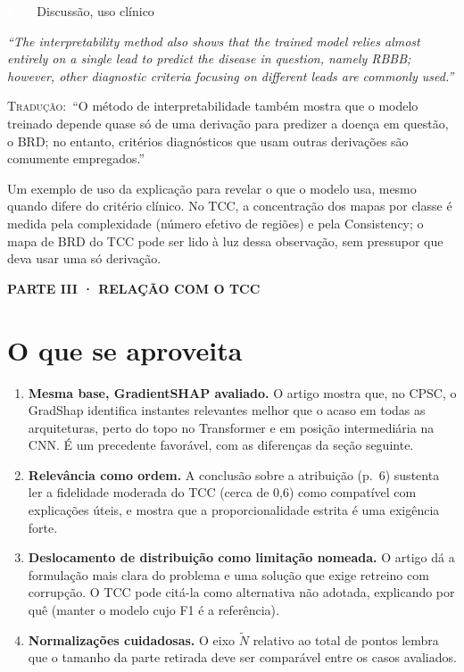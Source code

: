 \documentclass[11pt,a4paper]{article}
\newcommand{\pagechip}[1]{{\setlength{\fboxsep}{1.5pt}\colorbox{cAcc}{\textcolor{white}{\scriptsize\texttt{#1}}}}}
\newcommand{\partbar}[1]{\par\vspace{1.2em}\noindent\colorbox{black!80}{\parbox{\dimexpr\linewidth-2\fboxsep}{\color{white}\bfseries\sffamily\MakeUppercase{#1}}}\par\vspace{0.4em}}
\newenvironment{origquote}{\par\itshape\small}{\par}
\newenvironment{tradquote}{\par\small\textsc{Tradução:}\ }{\par}
\newcommand{\explab}[1]{\par\smallskip{\small\color{cAcc}\textbf{\MakeUppercase{#1}}}\par}
\begin{document}
\begin{citacard}{\pagechip{p. 7} Discussão, uso clínico}
\begin{origquote}“The interpretability method also shows that the trained model relies almost entirely on a single lead to predict the disease in question, namely RBBB; however, other diagnostic criteria focusing on different leads are commonly used.”\end{origquote}
\begin{tradquote}“O método de interpretabilidade também mostra que o modelo treinado depende quase só de uma derivação para predizer a doença em questão, o BRD; no entanto, critérios diagnósticos que usam outras derivações são comumente empregados.”\end{tradquote}
\explab{Explicação}
Um exemplo de uso da explicação para revelar o que o modelo usa, mesmo quando difere do critério clínico. No TCC, a concentração dos mapas por classe é medida pela complexidade (número efetivo de regiões) e pela Consistency; o mapa de BRD do TCC pode ser lido à luz dessa observação, sem pressupor que deva usar uma só derivação.
\end{citacard}

\partbar{Parte III · Relação com o TCC}

\section{O que se aproveita}
\begin{enumerate}
\item \textbf{Mesma base, GradientSHAP avaliado.} O artigo mostra que, no CPSC, o GradShap identifica instantes relevantes melhor que o acaso em todas as arquiteturas, perto do topo no Transformer e em posição intermediária na CNN. É um precedente favorável, com as diferenças da seção seguinte.
\item \textbf{Relevância como ordem.} A conclusão sobre a atribuição (p.~6) sustenta ler a fidelidade moderada do TCC (cerca de 0,6) como compatível com explicações úteis, e mostra que a proporcionalidade estrita é uma exigência forte.
\item \textbf{Deslocamento de distribuição como limitação nomeada.} O artigo dá a formulação mais clara do problema e uma solução que exige retreino com corrupção. O TCC pode citá-la como alternativa não adotada, explicando por quê (manter o modelo cujo F1 é a referência).
\item \textbf{Normalizações cuidadosas.} O eixo $\tilde{N}$ relativo ao total de pontos lembra que o tamanho da parte retirada deve ser comparável entre os casos avaliados.
\end{enumerate}
\end{document}
